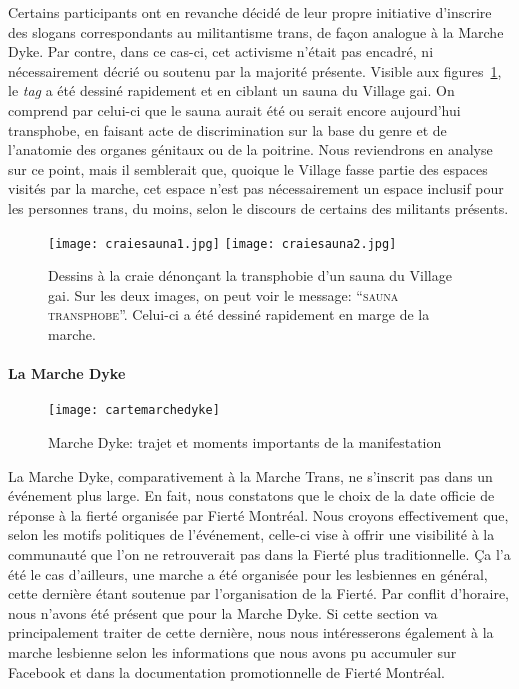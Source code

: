 Certains participants ont en revanche décidé de leur propre initiative d'inscrire des slogans correspondants au militantisme trans, de façon analogue à la Marche Dyke.
Par contre, dans ce cas-ci, cet activisme n'était pas encadré, ni nécessairement décrié ou soutenu par la majorité présente.
Visible aux figures~\ref{figs:craietrottoir}, le \emph{tag} a été dessiné rapidement et en ciblant un sauna du Village gai.
On comprend par celui-ci que le sauna aurait été ou serait encore aujourd'hui transphobe, en faisant acte de discrimination sur la base du genre et de l'anatomie des organes génitaux ou de la poitrine.
Nous reviendrons en analyse sur ce point, mais il semblerait que, quoique le Village fasse partie des espaces visités par la marche, cet espace n'est pas nécessairement un espace inclusif pour les personnes trans, du moins, selon le discours de certains des militants présents.

\begin{figure}[ht]
 \centering
 {\texttt{[image: craiesauna1.jpg]}}
 {\texttt{[image: craiesauna2.jpg]}}
 \caption[Dessin à la craie contre la transphobie]{Dessins à la craie dénonçant la transphobie d'un sauna du Village gai. Sur les deux images, on peut voir le message: \enquote{\textsc{sauna transphobe}}. Celui-ci a été dessiné rapidement en marge de la marche.}\label{figs:craietrottoir}
\end{figure}

\paragraph{La Marche Dyke}
\label{subsubsec:marchedyke}

\begin{figure}[ht]
 \centering
 \texttt{[image: cartemarchedyke]}
 \caption[Marche Dyke: trajet et événements]{Marche Dyke: trajet et moments importants de la manifestation}\label{fig:cartemarchedyke}
\end{figure}

La Marche Dyke, comparativement à la Marche Trans, ne s'inscrit pas dans un événement plus large.
En fait, nous constatons que le choix de la date officie de réponse à la fierté organisée par Fierté Montréal.
Nous croyons effectivement que, selon les motifs politiques de l'événement, celle-ci vise à offrir une visibilité à la communauté \dyke{} que l'on ne retrouverait pas dans la Fierté plus traditionnelle.
Ça l'a été le cas d'ailleurs, une marche a été organisée pour les lesbiennes en général, cette dernière étant soutenue par l'organisation de la Fierté.
Par conflit d'horaire, nous n'avons été présent que pour la Marche Dyke.
Si cette section va principalement traiter de cette dernière, nous nous intéresserons également à la marche lesbienne selon les informations que nous avons pu accumuler sur Facebook et dans la documentation promotionnelle de Fierté Montréal.

